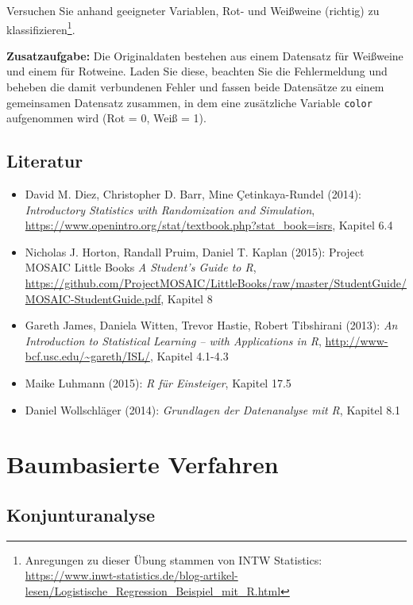 \documentclass[12pt,]{book}
\providecommand{\tightlist}{%
  \setlength{\itemsep}{0pt}\setlength{\parskip}{0pt}}
\begin{document}
Versuchen Sie anhand geeigneter Variablen, Rot- und Weißweine (richtig)
zu klassifizieren\footnote{Anregungen zu dieser Übung stammen von INTW
  Statistics:
  \url{https://www.inwt-statistics.de/blog-artikel-lesen/Logistische_Regression_Beispiel_mit_R.html}}.

\textbf{Zusatzaufgabe:} Die Originaldaten bestehen aus einem Datensatz
für Weißweine und einem für Rotweine. Laden Sie diese, beachten Sie die
Fehlermeldung und beheben die damit verbundenen Fehler und fassen beide
Datensätze zu einem gemeinsamen Datensatz zusammen, in dem eine
zusätzliche Variable \texttt{color} aufgenommen wird (Rot = 0, Weiß =
1).

\section{Literatur}\label{literatur-1}

\begin{itemize}
\tightlist
\item
  David M. Diez, Christopher D. Barr, Mine Çetinkaya-Rundel (2014):
  \emph{Introductory Statistics with Randomization and Simulation},
  \url{https://www.openintro.org/stat/textbook.php?stat_book=isrs},
  Kapitel 6.4
\item
  Nicholas J. Horton, Randall Pruim, Daniel T. Kaplan (2015): Project
  MOSAIC Little Books \emph{A Student's Guide to R},
  \url{https://github.com/ProjectMOSAIC/LittleBooks/raw/master/StudentGuide/MOSAIC-StudentGuide.pdf},
  Kapitel 8
\item
  Gareth James, Daniela Witten, Trevor Hastie, Robert Tibshirani (2013):
  \emph{An Introduction to Statistical Learning -- with Applications in
  R}, \url{http://www-bcf.usc.edu/~gareth/ISL/}, Kapitel 4.1-4.3
\item
  Maike Luhmann (2015): \emph{R für Einsteiger}, Kapitel 17.5
\item
  Daniel Wollschläger (2014): \emph{Grundlagen der Datenanalyse mit R},
  Kapitel 8.1
\end{itemize}

\chapter{Baumbasierte Verfahren}\label{baumbasierte-verfahren}

\section{Konjunturanalyse}\label{konjunturanalyse}
\end{document}
